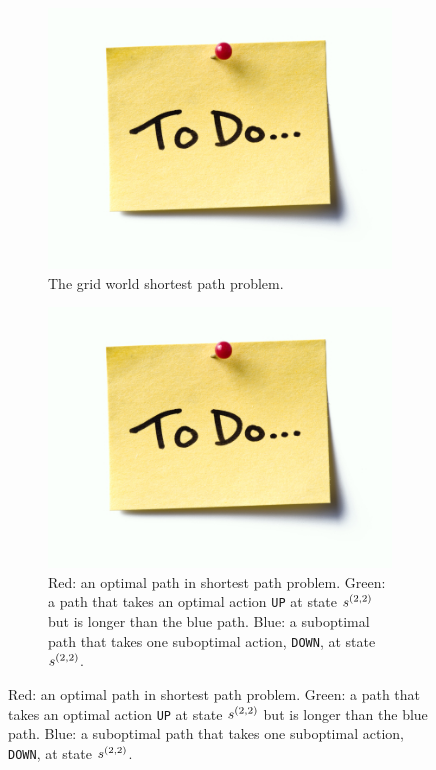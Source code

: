     \begin{figure}
        \centering
        \begin{subfigure}[b]{0.32\textwidth}
            \centering
            \includegraphics[width=\textwidth]{figures/todo.jpg}
            \caption{The grid world shortest path problem.}
            \label{fig:4:shortest_path_intro_a}
        \end{subfigure}
        \hfill
        \begin{subfigure}[b]{0.32\textwidth}
            \centering
            \includegraphics[width=\textwidth]{figures/todo.jpg}
            \caption{Red: an optimal path in shortest path problem. Green: a path that takes an optimal action \texttt{UP} at state $s^{(2,2)}$ but is longer than the blue path. Blue: a suboptimal path that takes one suboptimal action, \texttt{DOWN}, at state $s^{(2,2)}$.}

\end{subfigure}
\end{figure}
